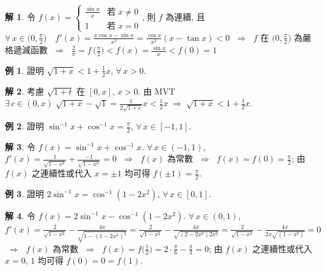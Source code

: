 \documentclass[12pt]{extarticle}
\newcommand{\ds}{\displaystyle}
\newcommand{\ie}{\;\Longrightarrow\;}
\theoremstyle{definition}
\newtheorem*{ex}{例}
\newtheorem*{sol}{解}
\begin{document}
\begin{sol}
  令 $\ds f(x) = \begin{cases}\frac{\sin x}{x} & \text{若}\;x\ne 0 \\ 1 & \text{若}\;x = 0 \end{cases}$, 則 $f$ 為連續, 且 $\ds\forall\,x\in\Big(0,\frac{\pi}{2}\Big)\quad f'(x) = \frac{x\cos x - \sin x}{x^2} = \frac{\cos x}{x^2}(x - \tan x) < 0$ $\ie$ $f$ 在 $\ds\Big(0,\frac{\pi}{2}\Big)$ 為嚴格遞減函數 $\ie$ $\ds\frac{2}{\pi} = f\,\Big(\frac{\pi}{2}\Big) < f(x) = \frac{\sin x}{x} < f(0) = 1$     
\end{sol}

\begin{ex}
  證明 $\ds\sqrt{1 + x} < 1 + \frac{1}{2}x$, $\forall\,x > 0$. 
\end{ex}

\begin{sol}
  考慮 $\ds\sqrt{1 + t}$ 在 $\ds[0, x]$, $\ds x > 0$. 由 MVT $\ds\exists\,c\in(0, x)\;\sqrt{1 + x} - \sqrt{1} = \frac{1}{2\sqrt{1 + c}} x < \frac{1}{2}x \ie \sqrt{1 + x} < 1 + \frac{1}{2}x$. 
\end{sol}

\begin{ex}
  證明 $\ds\sin^{-1}x + \cos^{-1}x = \frac{\pi}{2}$, $\forall\,x\in[-1, 1]$. 
\end{ex}

\begin{sol}
  令 $\ds f(x) = \sin^{-1}x + \cos^{-1}x$. $\forall\,x\in(-1, 1)$, $\ds f'(x) = \frac{1}{\sqrt{1 - x^2}} + \frac{-1}{\sqrt{1 - x^2}} = 0$ $\ie$ $f(x)$ 為常數 $\ie$ $\ds f(x) = f(0) = \frac{\pi}{2}$; 由 $f(x)$ 之連續性或代入 $x = \pm 1$ 均可得 $\ds f(\pm 1) = \frac{\pi}{2}$.    
\end{sol}

\begin{ex}
  證明 $\ds 2\sin^{-1}x = \cos^{-1}(1 - 2x^2)$, $\forall\,x\in[0, 1]$. 
\end{ex}

\begin{sol}
  令 $\ds f(x) = 2\sin^{-1}x - \cos^{-1}(1 - 2x^2)$. $\forall\,x\in(0, 1)$, $\ds f'(x) = \frac{2}{\sqrt{1 - x^2}} - \frac{4x}{\sqrt{1 - (1 - 2x^2)^2}} = \frac{2}{\sqrt{1 - x^2}} - \frac{4x}{\sqrt{(2 - 2x^2)2x^2}} = \frac{2}{\sqrt{1 - x^2}} - \frac{4x}{2x\sqrt{(1 - x^2)}} = 0$ $\ie$ $f(x)$ 為常數 $\ie$ $\ds f(x) = f\Big(\frac{1}{2}\Big) = 2\cdot\frac{\pi}{6} - \frac{\pi}{3} = 0$; 由 $f(x)$ 之連續性或代入 $x = 0$, $1$ 均可得 $f(0) = 0 = f(1)$.   
\end{sol}
\end{document}
